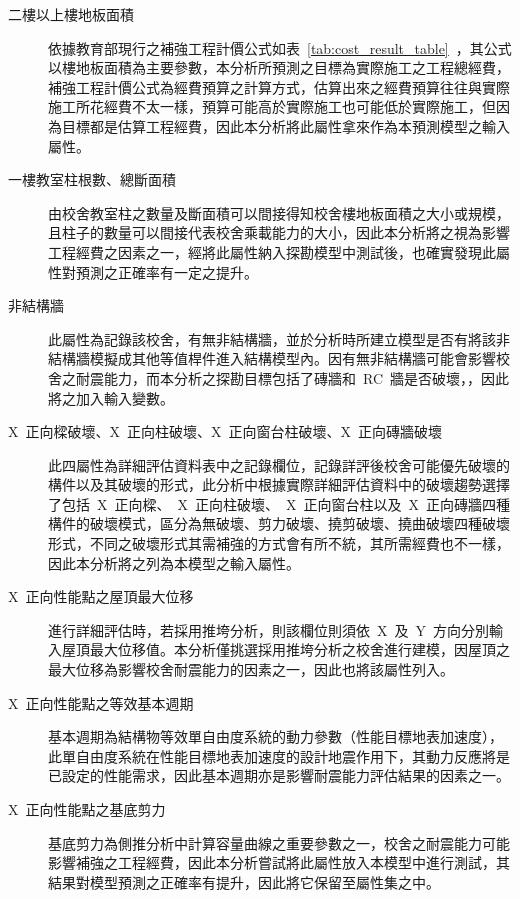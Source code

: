 \begin{description}
  \item[二樓以上樓地板面積]
  依據教育部現行之補強工程計價公式如表~\ref{tab:cost_result_table}~，其公式以樓地板面積為主要參數，本分析所預測之目標為實際施工之工程總經費，補強工程計價公式為經費預算之計算方式，估算出來之經費預算往往與實際施工所花經費不太一樣，預算可能高於實際施工也可能低於實際施工，但因為目標都是估算工程經費，因此本分析將此屬性拿來作為本預測模型之輸入屬性。
  \item[一樓教室柱根數、總斷面積]
  由校舍教室柱之數量及斷面積可以間接得知校舍樓地板面積之大小或規模，且柱子的數量可以間接代表校舍乘載能力的大小，因此本分析將之視為影響工程經費之因素之一，經將此屬性納入探勘模型中測試後，也確實發現此屬性對預測之正確率有一定之提升。
  \item[非結構牆]
  此屬性為記錄該校舍，有無非結構牆，並於分析時所建立模型是否有將該非結構牆模擬成其他等值桿件進入結構模型內。因有無非結構牆可能會影響校舍之耐震能力，而本分析之探勘目標包括了磚牆和~RC~牆是否破壞，，因此將之加入輸入變數。
  \item[X~正向樑破壞、X~正向柱破壞、X~正向窗台柱破壞、X~正向磚牆破壞]
  此四屬性為詳細評估資料表中之記錄欄位，記錄詳評後校舍可能優先破壞的構件以及其破壞的形式，此分析中根據實際詳細評估資料中的破壞趨勢選擇了包括~X~正向樑、~X~正向柱破壞、~X~正向窗台柱以及~X~正向磚牆四種構件的破壞模式，區分為無破壞、剪力破壞、撓剪破壞、撓曲破壞四種破壞形式，不同之破壞形式其需補強的方式會有所不統，其所需經費也不一樣，因此本分析將之列為本模型之輸入屬性。
  \item[X~正向性能點之屋頂最大位移]
  \cite{ncree08035}進行詳細評估時，若採用推垮分析，則該欄位則須依~X~及~Y~方向分別輸入屋頂最大位移值。本分析僅挑選採用推垮分析之校舍進行建模，因屋頂之最大位移為影響校舍耐震能力的因素之一，因此也將該屬性列入。
  \item[X~正向性能點之等效基本週期]
  \cite{ncree09015}基本週期為結構物等效單自由度系統的動力參數（性能目標地表加速度），此單自由度系統在性能目標地表加速度的設計地震作用下，其動力反應將是已設定的性能需求，因此基本週期亦是影響耐震能力評估結果的因素之一。
  \item[X~正向性能點之基底剪力]
  基底剪力為側推分析中計算容量曲線之重要參數之一，校舍之耐震能力可能影響補強之工程經費，因此本分析嘗試將此屬性放入本模型中進行測試，其結果對模型預測之正確率有提升，因此將它保留至屬性集之中。

\end{description}

